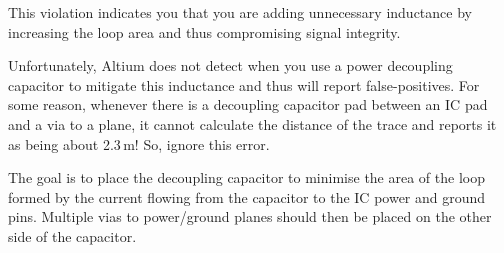 This violation indicates you that you are adding unnecessary
inductance by increasing the loop area and thus compromising signal
integrity.

Unfortunately, Altium does not detect when you use a power decoupling
capacitor to mitigate this inductance and thus will report
false-positives.  For some reason, whenever there is a decoupling
capacitor pad between an IC pad and a via to a plane, it cannot
calculate the distance of the trace and reports it as being about
2.3\,m!  So, ignore this error.

The goal is to place the decoupling capacitor to minimise the area of
the loop formed by the current flowing from the capacitor to the IC
power and ground pins.  Multiple vias to power/ground planes should
then be placed on the other side of the capacitor.

